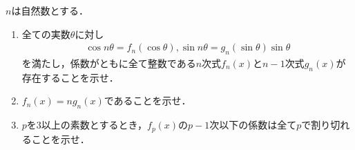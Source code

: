 $n$は自然数とする．
\begin{enumerate}
  \item 全ての実数$\theta$に対し
        \begin{align*}
          \cos n\theta=f_n(\cos\theta), \sin n\theta=g_n(\sin\theta)\sin\theta
        \end{align*}
        を満たし，係数がともに全て整数である$n$次式$f_n(x)$と$n-1$次式$g_n(x)$が存在することを示せ．
  \item $f_n(x)=ng_n(x)$であることを示せ．
  \item $p$を$3$以上の素数とするとき，$f_p(x)$の$p-1$次以下の係数は全て$p$で割り切れることを示せ．
\end{enumerate}
